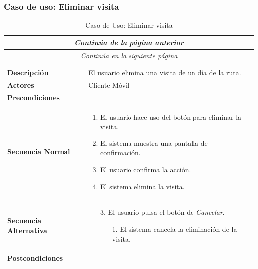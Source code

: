 \newpage
\subsubsection*{Caso de uso: Eliminar visita }
\begin{longtable}{| p{4cm} | p{10cm} |}
\endfirsthead
\multicolumn{2}{c}{\textit{Continúa de la página anterior}}\\[12pt]
\hline
\endhead
\hline
\multicolumn{2}{c}{\textit{Continúa en la siguiente página}} \\
\endfoot
\hline
\caption{Caso de Uso: Eliminar visita}\label{fig:1}\\
\endlastfoot


\hline
\multicolumn{2}{|c|}{\textbf{CU$<$16$>$ - Eliminar Visita}} \\

\hline
\textbf{Descripción} &
El usuario elimina una visita de un día de la ruta.\\

\hline
\textbf{Actores} &
Cliente Móvil\\

\hline
\textbf{Precondiciones} &
\\

\hline
\textbf{Secuencia Normal} &\mbox{}\par\vspace{-\baselineskip}
\begin{enumerate}[leftmargin=0.7cm, topsep=0.1cm]
\item El usuario hace uso del botón para eliminar la visita.
\item El sistema muestra una pantalla de confirmación.
\item El usuario confirma la acción.
\item El sistema elimina la visita.
\end{enumerate}


\\
\hline
\textbf{Secuencia Alternativa} &\mbox{}\par\vspace{-\baselineskip}
\begin{enumerate}[leftmargin=0.9cm, topsep=0.1cm]
\item[3.] El usuario pulsa el botón de \textit{Cancelar}.
	\begin{itemize}
	\item[1.] El sistema cancela la eliminación de la visita.
	\end{itemize}
\end{enumerate}
\\

\hline
\textbf{Postcondiciones} & \\
\hline
\end{longtable}



